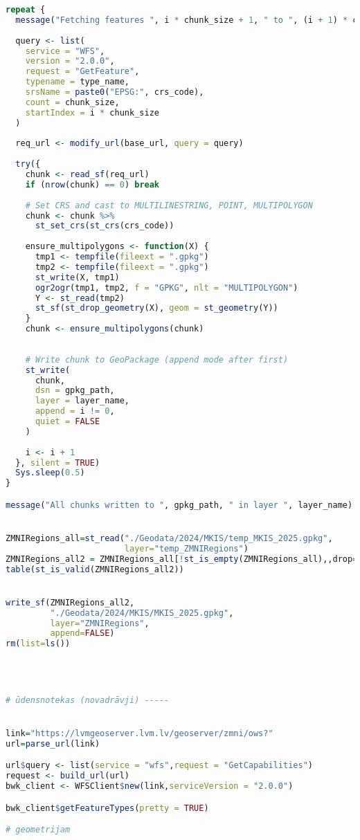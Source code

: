 \documentclass[
]{book}
\begin{document}
\begin{lstlisting}[language=R]
repeat {
  message("Fetching features ", i * chunk_size + 1, " to ", (i + 1) * chunk_size, "...")
  
  query <- list(
    service = "WFS",
    version = "2.0.0",
    request = "GetFeature",
    typename = type_name,
    srsName = paste0("EPSG:", crs_code),
    count = chunk_size,
    startIndex = i * chunk_size
  )
  
  req_url <- modify_url(base_url, query = query)
  
  try({
    chunk <- read_sf(req_url)
    if (nrow(chunk) == 0) break
    
    # Set CRS and cast to MULTILINESTRING, POINT, MULTIPOLYGON
    chunk <- chunk %>%
      st_set_crs(st_crs(crs_code))
    
    ensure_multipolygons <- function(X) {
      tmp1 <- tempfile(fileext = ".gpkg")
      tmp2 <- tempfile(fileext = ".gpkg")
      st_write(X, tmp1)
      ogr2ogr(tmp1, tmp2, f = "GPKG", nlt = "MULTIPOLYGON")
      Y <- st_read(tmp2)
      st_sf(st_drop_geometry(X), geom = st_geometry(Y))
    }
    chunk <- ensure_multipolygons(chunk)
    
    
    # Write chunk to GeoPackage (append mode after first)
    st_write(
      chunk, 
      dsn = gpkg_path,
      layer = layer_name,
      append = i != 0,
      quiet = FALSE
    )
    
    i <- i + 1
  }, silent = TRUE)
  Sys.sleep(0.5)
}

message("All chunks written to ", gpkg_path, " in layer ", layer_name)


ZMNIRegions_all=st_read("./Geodata/2024/MKIS/temp_MKIS_2025.gpkg",
                        layer="temp_ZMNIRegions")
ZMNIRegions_all2 = ZMNIRegions_all[!st_is_empty(ZMNIRegions_all),,drop=FALSE] # 0
table(st_is_valid(ZMNIRegions_all2))


write_sf(ZMNIRegions_all2,
         "./Geodata/2024/MKIS/MKIS_2025.gpkg",
         layer="ZMNIRegions",
         append=FALSE)
rm(list=ls())




# ūdensnotekas (novadrāvji) -----


link="https://lvmgeoserver.lvm.lv/geoserver/zmni/ows?"
url=parse_url(link)

url$query <- list(service = "wfs",request = "GetCapabilities")
request <- build_url(url)
bwk_client <- WFSClient$new(link,serviceVersion = "2.0.0")

bwk_client$getFeatureTypes(pretty = TRUE)

# geometrijam


\end{lstlisting}
\end{document}
